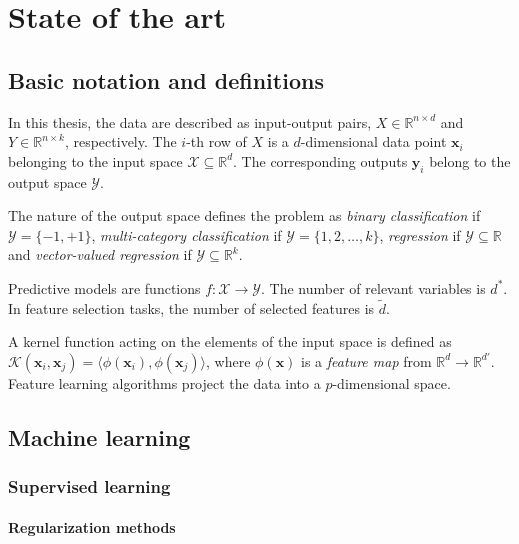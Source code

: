 
\chapter{State of the art} \label{chap:state-of-the-art}

\section{Basic notation and definitions} \label{sec:notation}
In this thesis, the data are described as input-output pairs, $X \in \mathbb{R}^{n \times d}$ and $Y \in \mathbb{R}^{n \times k}$, respectively.
The $i$-th row of $X$ is a $d$-dimensional data point $\bm{x}_{i}$ belonging to the input space $\mathcal{X}\subseteq\mathds{R}^d$. The corresponding outputs $\bm{y}_{i}$ belong to the output space $\mathcal{Y}$.

The nature of the output space defines the problem as {\sl binary classification} if  $\mathcal{Y} = \{-1,+1\}$, {\sl multi-category classification} if $\mathcal{Y} = \{1,2,\dots,k\}$, {\sl regression} if $\mathcal{Y}\subseteq\mathds{R}$ and {\sl vector-valued regression} if $\mathcal{Y}\subseteq\mathds{R}^k$.

Predictive models are functions $f: \mathcal{X} \rightarrow \mathcal{Y}$.
The number of relevant variables is $d^*$.
In feature selection tasks, the number of selected features is $\tilde d$.

A kernel function acting on the elements of the input space is defined as $\mathcal{K}(\bm{x}_{i},\bm{x}_{j})=\langle \phi(\bm{x}_{i}), \phi(\bm{x}_{j})\rangle$, where $\phi(\bm{x})$ is a {\em feature map} from $\mathds{R}^d \rightarrow \mathds{R}^{d'}$.
Feature learning algorithms project the data into a $p$-dimensional space.

\section{Machine learning} \label{sec:machine_learning}
  \subsection{Supervised learning} \label{subsec:supervised_learning}
    \subsubsection{Regularization methods}
